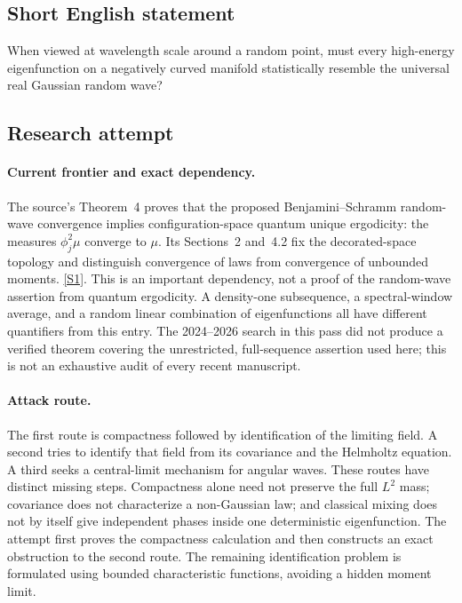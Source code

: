 \documentclass[11pt,a4paper]{article}
\newcommand{\sref}[2]{\hyperlink{source:#1:#2}{[S#2]}}
\numberwithin{equation}{section}
\begin{document}
\subsection{Short English statement}
When viewed at wavelength scale around a random point, must every high-energy eigenfunction on a negatively curved manifold statistically resemble the universal real Gaussian random wave?
\subsection{Research attempt}

\paragraph{Current frontier and exact dependency.}
The source's Theorem~4 proves that the proposed Benjamini--Schramm
random-wave convergence implies configuration-space quantum unique
ergodicity: the measures $\phi_j^2\mu$ converge to $\mu$. Its
Sections~2 and~4.2 fix the decorated-space topology and distinguish
convergence of laws from convergence of unbounded moments.
\sref{statement}{1}. This is an important dependency, not a proof of the
random-wave assertion from quantum ergodicity. A density-one subsequence,
a spectral-window average, and a random linear combination of
eigenfunctions all have different quantifiers from this entry.
The 2024--2026 search in this pass did not produce a verified theorem
covering the unrestricted, full-sequence assertion used here; this is
not an exhaustive audit of every recent manuscript.

\paragraph{Attack route.}
The first route is compactness followed by identification of the limiting
field. A second tries to identify that field from its covariance and the
Helmholtz equation. A third seeks a central-limit mechanism for angular
waves. These routes have distinct missing steps. Compactness alone need
not preserve the full $L^2$ mass; covariance does not characterize a
non-Gaussian law; and classical mixing does not by itself give independent
phases inside one deterministic eigenfunction. The attempt first proves
the compactness calculation and then constructs an exact obstruction to
the second route. The remaining identification problem is formulated
using bounded characteristic functions, avoiding a hidden moment limit.
\end{document}
